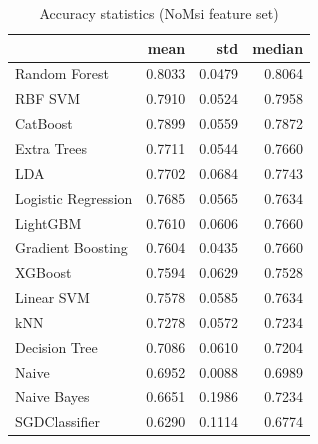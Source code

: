 \begin{table}
\caption{Accuracy statistics (NoMsi feature set)}
\label{tab:accuracy_NoMsi_stats}
\begin{tabular}{lrrr}
\toprule
 & mean & std & median \\
\midrule
Random Forest & 0.8033 & 0.0479 & 0.8064 \\
RBF SVM & 0.7910 & 0.0524 & 0.7958 \\
CatBoost & 0.7899 & 0.0559 & 0.7872 \\
Extra Trees & 0.7711 & 0.0544 & 0.7660 \\
LDA & 0.7702 & 0.0684 & 0.7743 \\
Logistic Regression & 0.7685 & 0.0565 & 0.7634 \\
LightGBM & 0.7610 & 0.0606 & 0.7660 \\
Gradient Boosting & 0.7604 & 0.0435 & 0.7660 \\
XGBoost & 0.7594 & 0.0629 & 0.7528 \\
Linear SVM & 0.7578 & 0.0585 & 0.7634 \\
kNN & 0.7278 & 0.0572 & 0.7234 \\
Decision Tree & 0.7086 & 0.0610 & 0.7204 \\
Naive & 0.6952 & 0.0088 & 0.6989 \\
Naive Bayes & 0.6651 & 0.1986 & 0.7234 \\
SGDClassifier & 0.6290 & 0.1114 & 0.6774 \\
\bottomrule
\end{tabular}
\end{table}
